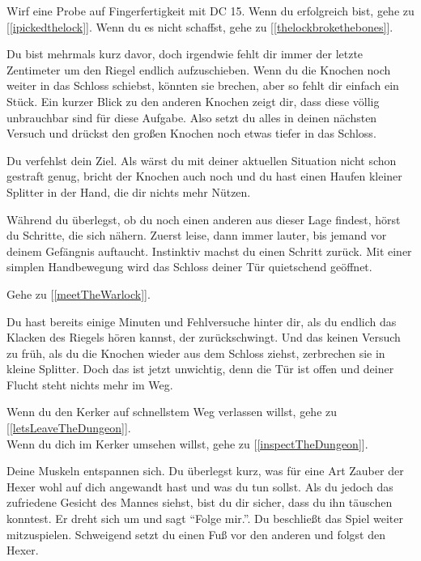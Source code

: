 Wirf eine Probe auf Fingerfertigkeit mit DC 15. Wenn du erfolgreich bist, gehe zu [\ref{ipickedthelock}]. Wenn du es nicht schaffst, gehe zu [\ref{thelockbrokethebones}].


Du bist mehrmals kurz davor, doch irgendwie fehlt dir immer der letzte Zentimeter um den Riegel endlich aufzuschieben. Wenn du die Knochen noch weiter in das Schloss schiebst, könnten sie brechen, aber so fehlt dir einfach ein Stück. Ein kurzer Blick zu den anderen Knochen zeigt dir, dass diese völlig unbrauchbar sind für diese Aufgabe. Also setzt du alles in deinen nächsten Versuch und drückst den großen Knochen noch etwas tiefer in das Schloss.

Du verfehlst dein Ziel. Als wärst du mit deiner aktuellen Situation nicht schon gestraft genug, bricht der Knochen auch noch und du hast einen Haufen kleiner Splitter in der Hand, die dir nichts mehr Nützen.

Während du überlegst, ob du noch einen anderen aus dieser Lage findest, hörst du Schritte, die sich nähern. Zuerst leise, dann immer lauter, bis jemand vor deinem Gefängnis auftaucht. Instinktiv machst du einen Schritt zurück. Mit einer simplen Handbewegung wird das Schloss deiner Tür quietschend geöffnet.

Gehe zu [\ref{meetTheWarlock}].


Du hast bereits einige Minuten und Fehlversuche hinter dir, als du endlich das Klacken des Riegels hören kannst, der zurückschwingt. Und das keinen Versuch zu früh, als du die Knochen wieder aus dem Schloss ziehst, zerbrechen sie in kleine Splitter. Doch das ist jetzt unwichtig, denn die Tür ist offen und deiner Flucht steht nichts mehr im Weg.

Wenn du den Kerker auf schnellstem Weg verlassen willst, gehe zu [\ref{letsLeaveTheDungeon}].
\\Wenn du dich im Kerker umsehen willst, gehe zu [\ref{inspectTheDungeon}].


Deine Muskeln entspannen sich. Du überlegst kurz, was für eine Art Zauber der Hexer wohl auf dich angewandt hast und was du tun sollst. Als du jedoch das zufriedene Gesicht des Mannes siehst, bist du dir sicher, dass du ihn täuschen konntest. Er dreht sich um und sagt ``Folge mir.''. Du beschließt das Spiel weiter mitzuspielen. Schweigend setzt du einen Fuß vor den anderen und folgst den Hexer.

